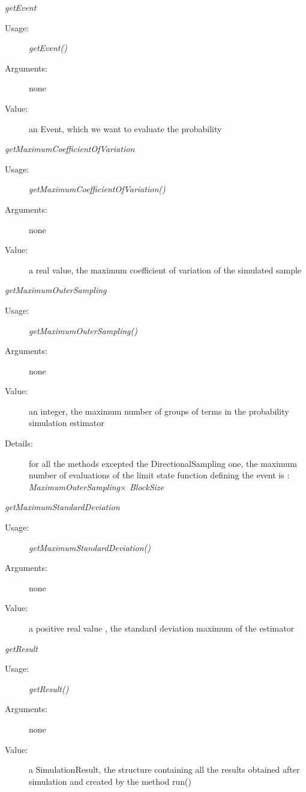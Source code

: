 \begin{description}
\begin{description}
\item \textit{getEvent}
\begin{description}
\item[Usage:] \textit{getEvent()}
\item[Arguments:] none
\item[Value:]  an Event, which we want to evaluate the probability
\end{description}
\bigskip


\item \textit{getMaximumCoefficientOfVariation}
\begin{description}
\item[Usage:] \textit{getMaximumCoefficientOfVariation()}
\item[Arguments:] none
\item[Value:]  a real value, the maximum coefficient of variation of the simulated sample
\end{description}
\bigskip

\item \textit{getMaximumOuterSampling}
\begin{description}
\item[Usage:] \textit{getMaximumOuterSampling()}
\item[Arguments:] none
\item[Value:]  an integer, the maximum number of groups of terms in the probability simulation estimator
\item[Details:] for all the methods excepted the DirectionalSampling one, the maximum number of evaluations of the limit state function defining the event is : \textit{MaximumOuterSampling$\times$ BlockSize}
\end{description}
\bigskip

\item \textit{getMaximumStandardDeviation}
\begin{description}
\item[Usage:] \textit{getMaximumStandardDeviation()}
\item[Arguments:] none
\item[Value:]  a positive real value , the standard deviation maximum of the estimator
\end{description}
\bigskip


\item \textit{getResult}
\begin{description}
\item[Usage:] \textit{getResult()}
\item[Arguments:] none
\item[Value:]  a SimulationResult, the structure containing all the results obtained after simulation and created by the method run()
\end{description}
\bigskip


\end{description}
\end{description}
